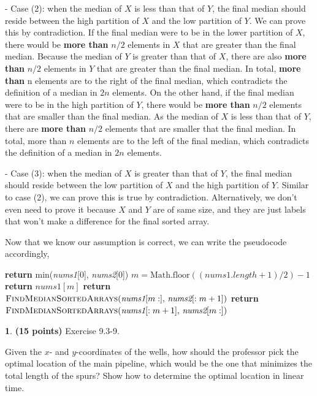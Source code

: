 \documentclass[11pt]{article}
\theoremstyle{definition}
\theoremstyle{theorem}
\newtheorem{prob}{}
\begin{document}
- Case (2): when the median of $X$ is less than that of $Y$, the final median should reside between the high partition of $X$ and the low partition of $Y$. We can prove this by contradiction. If the final median were to be in the lower partition of $X$, there would be \textbf{more than} $n/2$ elements in $X$ that are greater than the final median. Because the median of $Y$ is greater than that of $X$, there are also \textbf{more than} $n/2$ elements in $Y$ that are greater than the final median. In total, \textbf{more than} n elements are to the right of the final median, which contradicts the definition of a median in $2n$ elements. On the other hand, if the final median were to be in the high partition of $Y$, there would be \textbf{more than} $n/2$ elements that are smaller than the final median. As the median of $X$ is less than that of $Y$, there are \textbf{more than} $n/2$ elements that are smaller that the final median. In total, more than $n$ elements are to the left of the final median, which contradicts the definition of a median in $2n$ elements.

- Case (3): when the median of $X$ is greater than that of $Y$, the final median should reside between the low partition of $X$ and the high partition of $Y$. Similar to case (2), we can prove this is true by contradiction. Alternatively, we don't even need to prove it because $X$ and $Y$ are of same size, and they are just labels that won't make a difference for the final sorted array.

Now that we know our assumption is correct, we can write the pseudocode accordingly,
\begin{algorithmic}[1]
		\State \textbf{return} min(\textit{nums1}[0], \textit{nums2}[0])
	\EndIf
	\State $m = \text{Math.floor}((\textit{nums1}.length + 1)/2) - 1$
		\State \textbf{return} $\textit{nums1}[m]$
	\EndIf
		\State \textbf{return} $\textproc{\textsc{FindMedianSortedArrays}}(\textit{nums1}[m: ] \text{, }\textit{nums2}[:m+1])$
	\EndIf
	\State \textbf{return} $\textproc{\textsc{FindMedianSortedArrays}}(\textit{nums1}[:m+1] \text{, } \textit{nums2}[m:])$
\EndFunction
\end{algorithmic}


\newpage
\begin{prob} \textbf{(15 points)} Exercise 9.3-9.
\end{prob}
Given the $x$- and $y$-coordinates of the wells, how should the professor pick the optimal location of the main pipeline, which would be the one that minimizes the total length of the spurs? Show how to determine the optimal location in linear time.
\end{document}
